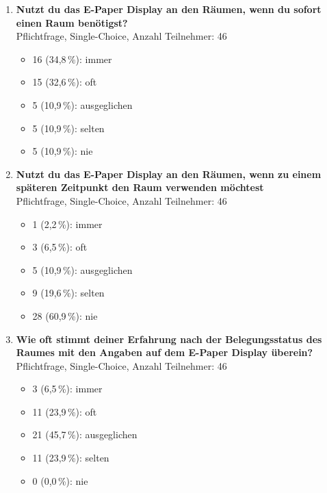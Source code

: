 \begin{enumerate}
    \item \textbf{Nutzt du das E-Paper Display an den Räumen, wenn du sofort einen Raum benötigst?} \\ 
    Pflichtfrage, Single-Choice, Anzahl Teilnehmer: 46
    \begin{itemize}
        \item[] 16 (34,8\,\%): immer
        \item[] 15 (32,6\,\%): oft
        \item[] 5 (10,9\,\%): ausgeglichen
        \item[] 5 (10,9\,\%): selten
        \item[] 5 (10,9\,\%): nie
    \end{itemize}
    
    \item \textbf{Nutzt du das E-Paper Display an den Räumen, wenn zu einem späteren Zeitpunkt den Raum verwenden möchtest} \\ 
    Pflichtfrage, Single-Choice, Anzahl Teilnehmer: 46
    \begin{itemize}
        \item[] 1 (2,2\,\%): immer
        \item[] 3 (6,5\,\%): oft
        \item[] 5 (10,9\,\%): ausgeglichen
        \item[] 9 (19,6\,\%): selten
        \item[] 28 (60,9\,\%): nie
    \end{itemize}
    
    \item \textbf{Wie oft stimmt deiner Erfahrung nach der Belegungsstatus des Raumes mit den Angaben auf dem E-Paper Display überein?} \\ 
    Pflichtfrage, Single-Choice, Anzahl Teilnehmer: 46
    \begin{itemize}
        \item[] 3 (6,5\,\%): immer
        \item[] 11 (23,9\,\%): oft
        \item[] 21 (45,7\,\%): ausgeglichen
        \item[] 11 (23,9\,\%): selten
        \item[] 0 (0,0\,\%): nie
    \end{itemize}
    

\end{enumerate}
